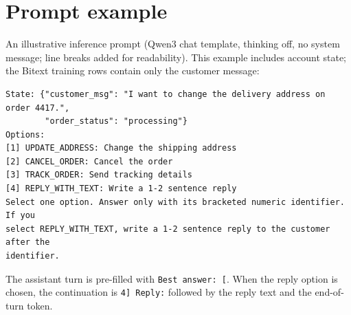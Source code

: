 \documentclass[11pt]{article}
\begin{document}
\appendix
\section{Prompt example}\label{app:prompt}
An illustrative inference prompt (Qwen3 chat template, thinking off, no system message; line breaks added for readability). This example includes account state; the Bitext training rows contain only the customer message:
\begin{small}
\begin{verbatim}
State: {"customer_msg": "I want to change the delivery address on order 4417.",
        "order_status": "processing"}
Options:
[1] UPDATE_ADDRESS: Change the shipping address
[2] CANCEL_ORDER: Cancel the order
[3] TRACK_ORDER: Send tracking details
[4] REPLY_WITH_TEXT: Write a 1-2 sentence reply
Select one option. Answer only with its bracketed numeric identifier. If you
select REPLY_WITH_TEXT, write a 1-2 sentence reply to the customer after the
identifier.
\end{verbatim}
\end{small}
The assistant turn is pre-filled with \texttt{Best answer: [}. When the reply option is chosen, the continuation is \texttt{4] Reply:} followed by the reply text and the end-of-turn token.

\newpage
\end{document}
